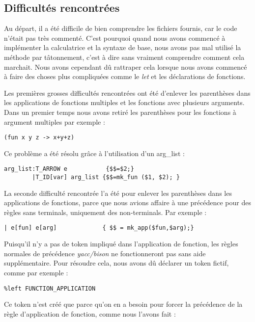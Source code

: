 \documentclass{article}
\begin{document}
\subsection{Difficultés rencontrées}


Au départ, il a été difficile de bien comprendre les fichiers fournis, car le code n'était pas très commenté. C'est pourquoi quand nous avons commencé à implémenter la calculatrice et la syntaxe de base, nous avons pas mal utilisé la méthode par tâtonnement, c'est à dire sans vraiment comprendre comment cela marchait. Nous avons cependant dû rattraper cela lorsque nous avons commencé à faire des choses plus compliquées comme le \emph{let} et les déclarations de fonctions.



	Les premières grosses difficultés rencontrées ont été d'enlever les parenthèses dans les applications de fonctions multiples et les fonctions avec plusieurs arguments. Dans un premier temps nous avons retiré les parenthèses pour les fonctions à argument multiples par exemple : 
	
	
\begin{verbatim}
(fun x y z -> x+y+z)
\end{verbatim}

 Ce problème a été résolu grâce à l'utilisation d'un arg\_list :

\begin{verbatim}
arg_list:T_ARROW e           {$$=$2;}        
        |T_ID[var] arg_list {$$=mk_fun ($1, $2); }
\end{verbatim}


	La seconde difficulté rencontrée l'a été pour enlever les parenthèses dans les applications de fonctions, parce que nous avions affaire à une précédence pour des règles sans terminals, uniquement des non-terminals.
Par exemple : 	
	
\begin{verbatim}
| e[fun] e[arg]             { $$ = mk_app($fun,$arg);}
\end{verbatim}

Puisqu'il n'y a pas de token impliqué dans l'application de fonction, les règles normales de précédence \emph{yacc/bison} ne fonctionneront pas sans aide supplémentaire. Pour résoudre cela, nous avons dû déclarer un token fictif, comme par exemple : 
	
\begin{verbatim}
%left FUNCTION_APPLICATION
\end{verbatim}	
 Ce token n'est créé que parce qu'on en a besoin pour forcer la précédence de la règle d'application de fonction, comme nous l'avons fait : 
	
\end{document}
